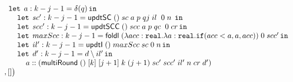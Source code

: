 \begin{figure}
\[\begin{array}{l}
 \hspace{0.4cm} \mathop{\mathtt{let}} \; a: k - j - 1 = \delta (q)  \mathop{ \mathtt{in}} \\
 \hspace{0.8cm} \mathop{\mathtt{let}} \; sc': k - j - 1 =  \mathsf{updtSC} \; () \; sc  \; a \; p
                \; qj \; il \;  \; 0 \;  n \;  \mathop{ \mathtt{in}} \\
 \hspace{0.8cm} \mathop{\mathtt{let}} \; scc': k - j - 1 =  \mathsf{updtSCC} \; () \; scc \; a \; p
                \; qc \;  \; 0 \;  cr \mathop{ \mathtt{in}} \\
 \hspace{0.8cm} \mathop{\mathtt{let}} \; maxScc: k - j - 1 =  \mathsf{foldl} \; 
                (\lambda acc : \mathtt{real}. \lambda a: \mathtt{real}. 
                \mathtt{if} ( acc < a, a, acc)) \; 0 \; scc' \mathop{ \mathtt{in}} \\
 \hspace{0.8cm} \mathop{\mathtt{let}} \; il': k - j - 1 =  \mathsf{updtI}  \; () \; maxScc \; sc
                \; 0 \; n  \mathop{ \mathtt{in}} \\
 \hspace{0.8cm} \mathop{\mathtt{let}} \; d': k - j - 1 =  d \setminus il' \mathop{ \mathtt{in}} \\
 \hspace{1.2cm} a :: (\mathsf{multiRound} \; () \; [k] \; [j + 1]  
                 \; k \; (j+1) \; sc' \; scc' \; il'
                 \; n \; cr \; d')\\ 
 \hspace{0.2cm} , []  \big)
\end{array}
\]

\end{figure}


